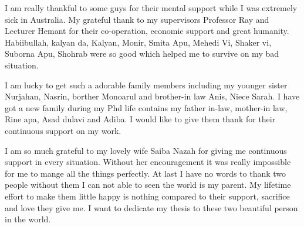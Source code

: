 I am really thankful to some guys for their mental support while I was extremely sick in Australia. My grateful thank to my supervisors Professor Ray and Lecturer Hemant for their co-operation, economic support and great humanity. Habiibullah, kalyan da, Kalyan, Monir, Smita Apu, Mehedi Vi, Shaker vi, Suborna Apu, Shohrab  were so good which helped me to survive on my bad situation.


I am lucky to get such a adorable family members including my younger sister Nurjahan, Nasrin, borther Monoarul and brother-in law Anis, Niece Sarah. I have got a new family during my Phd life contains my father in-law, mother-in law, Rine apa, Asad dulavi and Adiba. I would like to give them thank for their continuous support on my work.

I am so much grateful to my lovely wife Saiba Nazah for giving me continuous support in every situation. Without her encouragement it was really impossible for me to mange all the things perfectly.
At last I have no words to thank two people without them I can not able to seen the world is my parent. My lifetime effort to make them little happy is nothing compared to their support, sacrifice and love they give me. I want to dedicate my thesis to these two beautiful person in the world. 